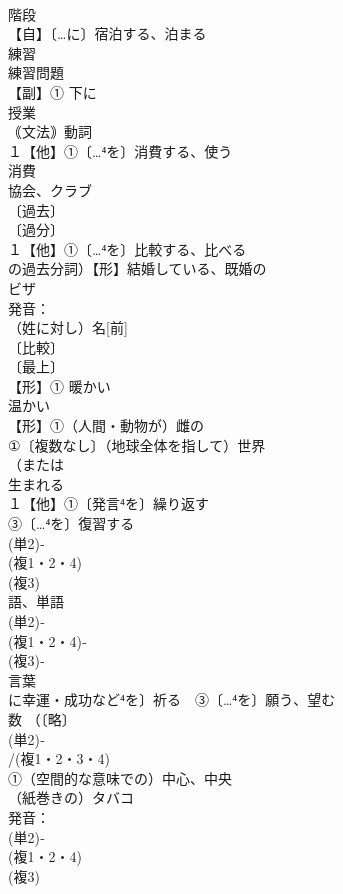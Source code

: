 \documentclass[8pt]{extreport}
\begin{document}
\begin{CJK}{UTF8}{min}
\\	階段 
\\	【自】〔…に〕宿泊する、泊まる
\\	練習 
\\	練習問題
\\	【副】① 下に 
\\	授業 
\\	｟文法｠動詞 
\\	１【他】①〔…⁴を〕消費する、使う 
\\	消費
\\	協会、クラブ 
\\	〔過去〕
\\	〔過分〕
\\	１【他】①〔…⁴を〕比較する、比べる 
\\	の過去分詞）【形】結婚している、既婚の 
\\	ビザ 
\\	発音：
\\	（姓に対し）名[前] 
\\	〔比較〕
\\	〔最上〕
\\	【形】① 暖かい 
\\	温かい
\\	【形】①（人間・動物が）雌の 
\\	①〔複数なし〕（地球全体を指して）世界 
\\	（または
\\	生まれる
\\	１【他】①〔発言⁴を〕繰り返す 
\\	③〔…⁴を〕復習する 
\\	(単2)‐
\\	(複1・2・4)
\\	(複3)
\\	語、単語 
\\	(単2)‐
\\	(複1・2・4)‐
\\	(複3)‐
\\	言葉
\\	に幸運・成功など⁴を〕祈る　③〔…⁴を〕願う、望む 
\\	数 （〔略〕
\\	(単2)‐
\\	/(複1・2・3・4)
\\	①（空間的な意味での）中心、中央 
\\	（紙巻きの）タバコ 
\\	発音：
\\	(単2)‐
\\	(複1・2・4)
\\	(複3)

\end{CJK}
\end{document}
